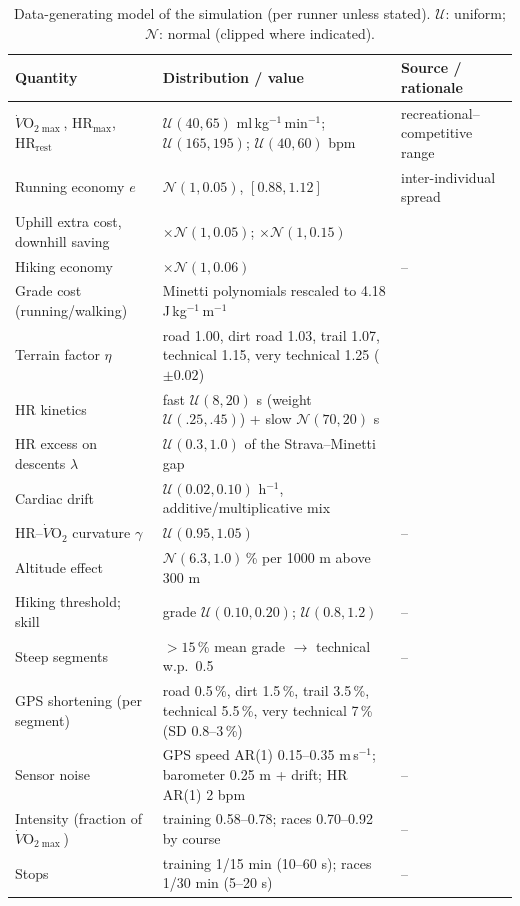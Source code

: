\documentclass[11pt,a4paper]{article}
\newcommand{\VO}{\ensuremath{\dot V\mathrm{O}_2}}
\newcommand{\VOmax}{\ensuremath{\dot V\mathrm{O}_{2\max}}}
\newcommand{\unit}{ml\,kg$^{-1}$\,min$^{-1}$}
\newcommand{\HRmax}{\ensuremath{\mathrm{HR}_{\max}}}
\newcommand{\HRrest}{\ensuremath{\mathrm{HR}_{\mathrm{rest}}}}
\begin{document}
\begin{table}[!htbp]\centering\small
\caption{Data-generating model of the simulation (per runner unless stated). $\mathcal U$: uniform; $\mathcal N$: normal (clipped where indicated).}\label{tab:params}
\begin{tabular}{p{4.3cm}p{6.8cm}p{4.0cm}}
\toprule
Quantity & Distribution / value & Source / rationale\\
\midrule
\VOmax, \HRmax, \HRrest & $\mathcal U(40,65)$ \unit; $\mathcal U(165,195)$; $\mathcal U(40,60)$ bpm & recreational--competitive range\\
Running economy $e$ & $\mathcal N(1,0.05)$, $[0.88,1.12]$ & inter-individual spread\\
Uphill extra cost, downhill saving & $\times\mathcal N(1,0.05)$; $\times\mathcal N(1,0.15)$ & \citet{minetti2002,vernillo2017}\\
Hiking economy & $\times\mathcal N(1,0.06)$ & --\\
Grade cost (running/walking) & Minetti polynomials rescaled to 4.18 J\,kg$^{-1}$\,m$^{-1}$ & \citet{minetti2002,acsm2021}\\
Terrain factor $\eta$ & road 1.00, dirt road 1.03, trail 1.07, technical 1.15, very technical 1.25 ($\pm0.02$) & \citet{voloshina2015}\\
HR kinetics & fast $\mathcal U(8,20)$ s (weight $\mathcal U(.25,.45)$) + slow $\mathcal N(70,20)$ s & \citet{hunt2015}\\
HR excess on descents $\lambda$ & $\mathcal U(0.3,1.0)$ of the Strava--Minetti gap & \citet{robb2017,lemire2021}\\
Cardiac drift & $\mathcal U(0.02,0.10)$ h$^{-1}$, additive/multiplicative mix & \citet{coyle2001}\\
HR--\VO{} curvature $\gamma$ & $\mathcal U(0.95,1.05)$ & --\\
Altitude effect & $\mathcal N(6.3,1.0)$\,\% per 1000 m above 300 m & \citet{wehrlin2006}\\
Hiking threshold; skill & grade $\mathcal U(0.10,0.20)$; $\mathcal U(0.8,1.2)$ & --\\
Steep segments & $>15$\,\% mean grade $\to$ technical w.p.\ 0.5 & --\\
GPS shortening (per segment) & road 0.5\,\%, dirt 1.5\,\%, trail 3.5\,\%, technical 5.5\,\%, very technical 7\,\% (SD 0.8--3\,\%) & \citet{gilgen2020}\\
Sensor noise & GPS speed AR(1) 0.15--0.35 m\,s$^{-1}$; barometer 0.25 m + drift; HR AR(1) 2 bpm & --\\
Intensity (fraction of \VOmax) & training 0.58--0.78; races 0.70--0.92 by course & --\\
Stops & training 1/15 min (10--60 s); races 1/30 min (5--20 s) & --\\
\bottomrule
\end{tabular}
\end{table}
\end{document}
